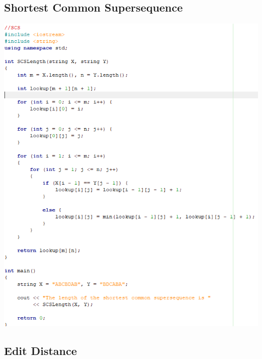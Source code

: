 \documentclass[11pt,twocolumn]{article}
\begin{document}
\subsection{Shortest Common Supersequence}

\includegraphics[scale=0.5]{scs}

\subsection{Edit Distance}
\end{document}
